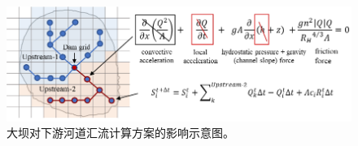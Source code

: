 {
\begin{figure}[htbp]
\centering
\includegraphics{Figures/陆地表面的水分循环/大坝对下游河道汇流计算方案的影响示意图.png}
\caption{大坝对下游河道汇流计算方案的影响示意图。}
\label{fig:大坝对下游河道汇流计算方案的影响示意图}
\end{figure}
}

